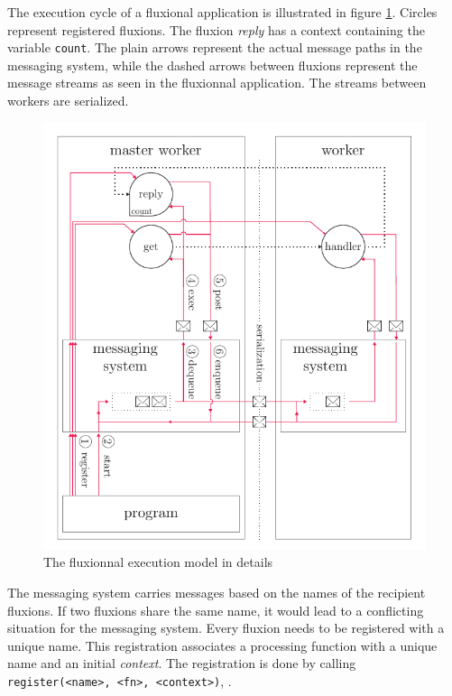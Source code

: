 The execution cycle of a fluxional application is illustrated in figure \ref{fig:MesSys}.
Circles represent registered fluxions.
The fluxion \textit{reply} has a context containing the variable \texttt{count}.
The plain arrows represent the actual message paths in the messaging system, while the dashed arrows between fluxions represent the message streams as seen in the fluxionnal application.
The streams between workers are serialized.

\begin{figure}[h!]
  \includegraphics[width=\linewidth]{ressources/schema-message.pdf}
  \caption{The fluxionnal execution model in details}
  \label{fig:MesSys}
\end{figure}

The messaging system carries messages based on the names of the recipient fluxions.
If two fluxions share the same name, it would lead to a conflicting situation for the messaging system.
Every fluxion needs to be registered with a unique name.
This registration associates a processing function with a unique name and an initial \textit{context}.
The registration is done by calling \texttt{register(<name>, <fn>, <context>)}, .

